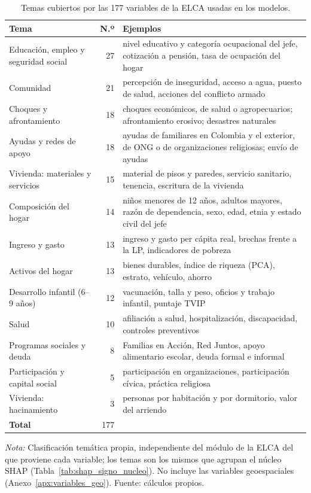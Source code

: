 \begin{table}[H]
  \centering
  \caption{Temas cubiertos por las 177 variables de la ELCA usadas en los modelos.}
  \label{tab:temas_variables}
  \footnotesize
  \begin{tabular}{>{\raggedright\arraybackslash}p{4.2cm}r>{\raggedright\arraybackslash}p{8.6cm}}
    \toprule
    \textbf{Tema} & \textbf{N.º} & \textbf{Ejemplos} \\
    \midrule
    Educación, empleo y seguridad social & 27 & nivel educativo y categoría ocupacional del jefe, cotización a pensión, tasa de ocupación del hogar \\
    Comunidad & 21 & percepción de inseguridad, acceso a agua, puesto de salud, acciones del conflicto armado \\
    Choques y afrontamiento & 18 & choques económicos, de salud o agropecuarios; afrontamiento erosivo; desastres naturales \\
    Ayudas y redes de apoyo & 18 & ayudas de familiares en Colombia y el exterior, de ONG o de organizaciones religiosas; envío de ayudas \\
    Vivienda: materiales y servicios & 15 & material de pisos y paredes, servicio sanitario, tenencia, escritura de la vivienda \\
    Composición del hogar & 14 & niños menores de 12 años, adultos mayores, razón de dependencia, sexo, edad, etnia y estado civil del jefe \\
    Ingreso y gasto & 13 & ingreso y gasto per cápita real, brechas frente a la LP, indicadores de pobreza \\
    Activos del hogar & 13 & bienes durables, índice de riqueza (PCA), estrato, vehículo, ahorro \\
    Desarrollo infantil (6--9 años) & 12 & vacunación, talla y peso, oficios y trabajo infantil, puntaje TVIP \\
    Salud & 10 & afiliación a salud, hospitalización, discapacidad, controles preventivos \\
    Programas sociales y deuda & 8 & Familias en Acción, Red Juntos, apoyo alimentario escolar, deuda formal e informal \\
    Participación y capital social & 5 & participación en organizaciones, participación cívica, práctica religiosa \\
    Vivienda: hacinamiento & 3 & personas por habitación y por dormitorio, valor del arriendo \\
    \midrule
    \textbf{Total} & 177 & \\
    \bottomrule
  \end{tabular}
  \begin{minipage}{0.95\textwidth}
    \vspace{4pt}
    \footnotesize \textit{Nota:} Clasificación temática propia, independiente del
    módulo de la ELCA del que proviene cada variable; los temas son los mismos que
    agrupan el núcleo SHAP (Tabla~\ref{tab:shap_signo_nucleo}). No incluye las variables geoespaciales
    (Anexo~\ref{apx:variables_geo}). Fuente: cálculos propios.
  \end{minipage}
\end{table}
